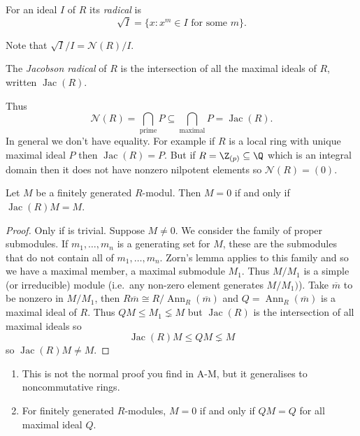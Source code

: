 \documentclass[a4paper]{article}
\DeclareMathOperator{\Ann}{Ann} %
\newcommand{\nilrad}[1]{\mathcal{N}({#1})} %
\newcommand{\jac}[1]{\operatorname{Jac}({#1})} %
\begin{document}
\begin{definition}[radical]
  For an ideal \(I\) of \(R\) its \emph{radical} is
  \[
    \sqrt I = \{x: x^m \in I \text{ for some } m\}.
  \]
\end{definition}
Note that \(\sqrt I /I = \nilrad R/I\).

\begin{definition}
  The \emph{Jacobson radical} of \(R\) is the intersection of all the maximal ideals of \(R\), written \(\jac R\).
\end{definition}
Thus
\[
  \nilrad R = \bigcap_{\text{prime}} P \subseteq \bigcap_{\text{maximal}} P = \jac R.
\]
In general we don't have equality. For example if \(R\) is a local ring with unique maximal ideal \(P\) then \(\jac R = P\). But if \(R = \Z_{(p)} \subseteq \Q\) which is an integral domain then it does not have nonzero nilpotent elements so \(\nilrad R = (0)\).

\begin{proposition}
  Let \(M\) be a finitely generated \(R\)-modul. Then \(M = 0\) if and only if \(\jac R M = M\).
\end{proposition}

\begin{proof}
  Only if is trivial. Suppose \(M \neq 0\). We consider the family of proper submodules. If \(m_1, \dots, m_n\) is a generating set for \(M\), these are the submodules that do not contain all of \(m_1, \dots, m_n\). Zorn's lemma applies to this family and so we have a maximal member, a maximal submodule \(M_1\). Thus \(M/M_1\) is a simple (or irreducible) module (i.e.\ any non-zero element generates \(M/M_1)\)). Take \(\overline m\) to be nonzero in \(M/M_1\), then \(R \overline m \cong R/\Ann_R(\overline m)\) and \(Q = \Ann_R(\overline m)\) is a maximal ideal of \(R\). Thus \(QM \leq M_1 \lneq M\) but \(\jac R\) is the intersection of all maximal ideals so
  \[
    \jac R M \leq QM \lneq M
  \]
  so \(\jac R M \neq M\).
\end{proof}

\begin{remark}\leavevmode
  \begin{enumerate}
  \item This is not the normal proof you find in A-M, but it generalises to noncommutative rings.
  \item For finitely generated \(R\)-modules, \(M = 0\) if and only if \(QM = Q\) for all maximal ideal \(Q\).
  \end{enumerate}
\end{remark}
\end{document}
